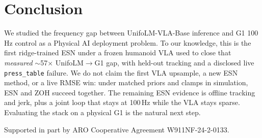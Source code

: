 \documentclass{article}
\begin{document}
\section{Conclusion}
We studied the frequency gap between UnifoLM-VLA-Base inference and G1 100\,Hz control as a Physical AI deployment problem.
To our knowledge, this is the first ridge-trained ESN under a frozen humanoid VLA used to close that \emph{measured} $\sim$57$\times$ UnifoLM$\rightarrow$G1 gap, with held-out tracking and a disclosed live \texttt{press\_table} failure.
We do not claim the first VLA upsample, a new ESN method, or a live RMSE win: under matched priors and clamps in simulation, ESN and ZOH succeed together.
The remaining ESN evidence is offline tracking and jerk, plus a joint loop that stays at 100\,Hz while the VLA stays sparse.
Evaluating the stack on a physical G1 is the natural next step.

\begin{ack}
Supported in part by ARO Cooperative Agreement W911NF-24-2-0133.
\end{ack}


{\small

}
\end{document}
